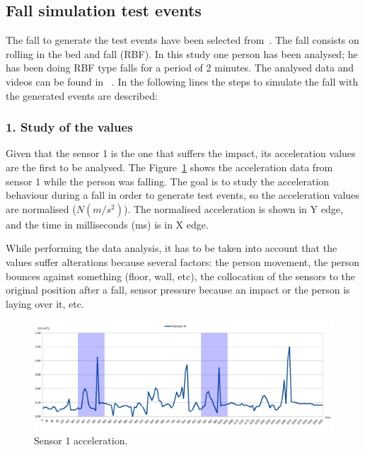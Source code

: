 \documentclass[conference]{IEEEtran}
\theoremstyle{definition}
\begin{document}
\subsection{Fall simulation test events} %

The fall to generate the test events have been selected from~\cite{Li2009,Pannurat2014}. 
The fall consists on rolling in the bed and fall (RBF). In this study one person has been 
analysed; he has been doing RBF type falls for a period of 2 minutes. The analysed 
data and videos can be found in ~\cite{}. In the following lines the steps to simulate 
the fall with the generated events are described:

\subsubsection*{1. Study of the values} Given that the sensor 1 is the one that suffers the
impact, its acceleration values are the first to be analysed. The Figure~\ref{fig:Sensor1Sombras} 
shows the acceleration data from sensor 1 while the person was falling. The goal is to study 
the acceleration behaviour during a fall in order to generate test events, so the acceleration 
values are normalised ($N(m/s^2)$). The normalised acceleration is shown in Y edge, and the 
time in milliseconds (ms) is in X edge.

While performing the data analysis, it has to be taken into account that the values suffer 
alterations because several factors: the person movement, the person bounces against something 
(floor, wall, etc), the collocation of the sensors to the original position after a fall, 
sensor pressure because an impact or the person is laying over it, etc.

 \begin{figure}[!h]
  \includegraphics[scale=0.375]{Sensor1Sombras}
  \caption[Sensor 1 acceleration]{Sensor 1 acceleration.}
  \label{fig:Sensor1Sombras}
\end{figure}
\end{document}
